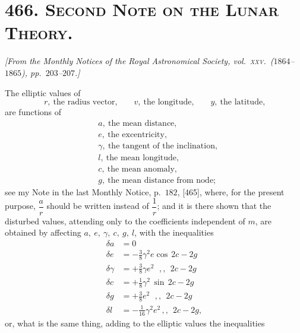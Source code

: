 \documentclass[11pt]{article}
\begin{document}
\section*{466. \textsc{Second Note on the Lunar Theory.}}

\begin{center}
\textit{[From the Monthly Notices of the Royal Astronomical Society,
vol.\ \textsc{xxv}.\ ($1864$--$1865$), pp.\ $203$--$207$.]}
\end{center}

\medskip

The elliptic values of
\[
r,\ \text{the radius vector,} \qquad
v,\ \text{the longitude,} \qquad
y,\ \text{the latitude,}
\]
are functions of
\begin{align*}
&a,\ \text{the mean distance,}\\
&e,\ \text{the excentricity,}\\
&\gamma,\ \text{the tangent of the inclination,}\\
&l,\ \text{the mean longitude,}\\
&c,\ \text{the mean anomaly,}\\
&g,\ \text{the mean distance from node;}
\end{align*}
see my Note in the last Monthly Notice, p.\ $182$, [465], where, for the
present purpose, $\dfrac{a}{r}$ should be written instead of
$\dfrac{1}{r}$; and it is there shown that the disturbed values,
attending only to the coefficients independent of $m$, are obtained by
affecting $a,\ e,\ \gamma,\ c,\ g,\ l$, with the inequalities
\begin{align*}
\delta a &= 0 \\
\delta e &= - \tfrac{3}{8}\gamma^{2}e \cos\,2c - 2g \\
\delta \gamma &= + \tfrac{3}{8}\gamma e^{2}\ \ \,,, \ \ 2c - 2g \\
\delta c &= + \tfrac{1}{8}\gamma^{2}\,\sin\,2c - 2g \\
\delta g &= + \tfrac{3}{8}e^{2}\ \ \,,, \ \ 2c - 2g \\
\delta l &= - \tfrac{1}{16}\gamma^{2}e^{2}\,,, \ \ 2c - 2g,
\end{align*}
or, what is the same thing, adding to the elliptic values the
inequalities
\end{document}
